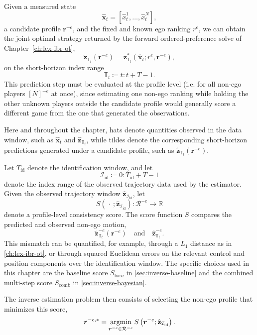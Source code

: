 Given a measured state
\[
\hat{\mathbf{x}}_t = \left[\hat{x}^1_t,\dots,\hat{x}^N_t\right],
\]
a candidate profile \(\boldsymbol{r}^{-e}\), and the fixed and known ego ranking
\(r^e\), we can obtain
the joint optimal strategy returned by the forward ordered-preference solve
of Chapter~\ref{ch:lex-ibr-ot},
\begin{equation}
\tilde{\mathbf{z}}_{\mathbb{T}_t}(\boldsymbol{r}^{-e})
=
\mathbf{z}^{*}_{\mathbb{T}_t}\!\left(\hat{\mathbf{x}}_t; r^e, \boldsymbol{r}^{-e}\right),
\label{eq:inverse_prediction}
\end{equation}
on the short-horizon index range
\[
\mathbb{T}_t \coloneq t:t+T-1.
\]
This prediction step must be evaluated at the profile level (i.e. for all
non-ego players $\left[N\right]^{-e}$ at once), since
estimating one non-ego ranking while holding the other unknown players outside the
candidate profile would generally score a different game from the one that generated
the observations.

Here and throughout the chapter, hats denote quantities observed in the data window,
such as \(\hat{\mathbf{x}}_t\) and \(\hat{\mathbf{z}}_{\mathbb{T}_t}\), while tildes
denote the corresponding short-horizon predictions generated under a candidate
profile, such as \(\tilde{\mathbf{z}}_{\mathbb{T}_t}(\boldsymbol{r}^{-e})\).

Let $T_{\mathrm{id}}$ denote the identification window, and let
\[
\mathcal{I}_{\mathrm{id}} \coloneq 0:T_{\mathrm{id}}+T-1
\]
denote the index range of the observed trajectory data used by the estimator.
Given the observed trajectory window
$\hat{\mathbf{z}}_{\mathcal{I}_{\mathrm{id}}}$,
let
\[
S\!\left(\,\cdot\,; \hat{\mathbf{z}}_{\mathcal{I}_{\mathrm{id}}}\right) : \mathcal R^{-e} \to \mathbb{R}
\]
denote a profile-level consistency score.
The score function $S$ compares the predicted and observed non-ego motion,
\[
\tilde{\mathbf{z}}^{-e}_{\mathbb{T}_t}(\boldsymbol{r}^{-e})
\quad\text{and}\quad
\hat{\mathbf{z}}^{-e}_{\mathbb{T}_t}.
\]
This mismatch can be quantified, for example, through a $L_1$ distance as in \cref{ch:lex-ibr-ot}, or through squared
Euclidean errors on the relevant control and position components over the
identification window.
The specific choices used in this chapter are the baseline score
$S_{\mathrm{base}}$ in \cref{sec:inverse-baseline} and the combined multi-step
score $S_{\mathrm{comb}}$ in \cref{sec:inverse-bayesian}.

The inverse estimation problem then consists of selecting the non-ego profile that minimizes
this score,
\begin{equation}
\boldsymbol{r}^{-e,*}
=
\mathop{\textrm{argmin}}_{\boldsymbol{r}^{-e} \in \mathcal R^{-e}}
S\left(\boldsymbol{r}^{-e}; \hat{\mathbf{z}}_{\mathcal{I}_{\mathrm{id}}}\right).
\label{eq:inverse_problem}
\end{equation}

